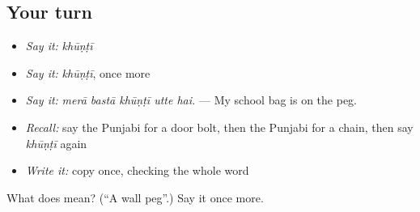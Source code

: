 \subsection*{Your turn}
\begin{itemize}
\raggedright
  \item \emph{Say it:} \emph{khūṇṭī}
  \item \emph{Say it:} \emph{khūṇṭī}, once more
  \item \emph{Say it:} \emph{merā bastā khūṇṭī utte hai.} — My school bag is on the peg.
  \item \emph{Recall:} say the Punjabi for a door bolt, then the Punjabi for a chain, then say \emph{khūṇṭī} again
  \item \emph{Write it:} copy \textbf{} once, checking the whole word
\end{itemize}

\begin{tcolorbox}[breakable,colback=teal!4,colframe=teal!35!black,title={Before you move on}]
What does  mean? (\textquotedblleft{}A wall peg\textquotedblright{}.) Say it once more.
\end{tcolorbox}
